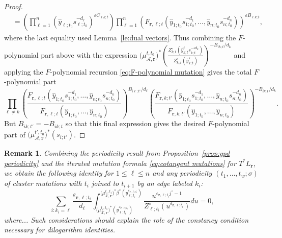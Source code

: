 \documentclass{amsart}
\newtheorem{remark}[theorem]{Remark}
\numberwithin{equation}{section}
\newcommand{\bfr}{{\boldsymbol{r}}}
\newcommand{\cA}{\mathcal{A}}
\newcommand{\cX}{\mathcal{X}}
\begin{document}
\begin{proof}
\begin{align*}
    &=\left(\prod_{\ell=1}^n (\hat y_{\ell;t_0} s_{\ell;t_0}^{-d_\ell})^{\varepsilon C_{\ell k;t}}\right) \prod_{\ell=1}^n \left(F_{\bfr,\ell;t}(\hat y_{1;t_0} s_{1;t_0}^{-d_1},\ldots,\hat y_{n;t_0} s_{n;t_0}^{-d_n})\right)^{\varepsilon B_{\ell k;t}},
  \end{align*}
  where the last equality used Lemma~\ref{le:dual vectors}.
  Thus combining the $F$-polynomial part above with the expression $\big(\mu_{\cA,\bfr}^{t,t_0}\big)^*\left(\frac{Z_{k;t}^\circ\left(\hat y_{k;t}^\varepsilon s_{k;t}^{-\varepsilon d_k}\right)}{Z_{k;t}^\circ(\hat y_{k;t}^\varepsilon)}\right)^{-B_{ik;t}/d_k}$ and applying the $F$-polynomial recursion \eqref{eq:F-polynomial mutation} gives the total $F$-polynomial part
  \[\prod_{\ell\ne k} \left(\frac{F_{\bfr,\ell;t}(\hat y_{1;t_0} s_{1;t_0}^{-d_1},\ldots,\hat y_{n;t_0} s_{n;t_0}^{-d_n})}{F_{\bfr,\ell;t}(\hat y_{1;t_0},\ldots,\hat y_{n;t_0})}\right)^{B_{i\ell;t'}/d_\ell} \left(\frac{F_{\bfr,k;t'}(\hat y_{1;t_0} s_{1;t_0}^{-d_1},\ldots,\hat y_{n;t_0} s_{n;t_0}^{-d_n})}{F_{\bfr,k;t'}(\hat y_{1;t_0},\ldots,\hat y_{n;t_0})}\right)^{-B_{ik;t}/d_k}.\]
  But $B_{ik;t'}=-B_{ik;t}$ so that this final expression gives the desired $F$-polynomial part of $\big(\mu_{\cA,\bfr}^{t',t_0}\big)^*(s_{i;t'})$.
\end{proof}

\begin{remark}
  Combining the periodicity result from Proposition~\ref{prop:gpd periodicity} and the iterated mutation formula \eqref{eq:cotangent mutations} for $T^* L_\bfr$, we obtain the following identity for $1\le\ell\le n$ and any periodicity $(t_1,\ldots,t_w;\sigma)$ of cluster mutations with $t_i$ joined to $t_{i+1}$ by an edge labeled $k_i$:
  \begin{equation}
    \sum_{i:k_i=\ell} \frac{\varepsilon_{\bfr,\ell;t_i}}{d_\ell} \int_{\big(\mu_{\cX,\bfr}^{t_i,t_1}\big)^*(y_{\ell;t_i}^{\varepsilon_{\bfr,\ell;t_i}})}^{\big(\mu_{\cX,\bfr}^{t_i,t_1}\big)^*\beta^*(y_{\ell;t_i}^{\varepsilon_{\bfr,\ell;t_i}})} \frac{u^{\varepsilon_{\bfr,\ell;t_i} j^\circ-1}}{Z^\circ_{\ell;t_i}(u^{\varepsilon_{\bfr,\ell;t_i}})}du=0,
  \end{equation}
  where...
  Such considerations should explain the role of the constancy condition \cite[Theorem 4.5]{Nak17} necessary for dilogarithm identities.
\end{remark}
\end{document}
